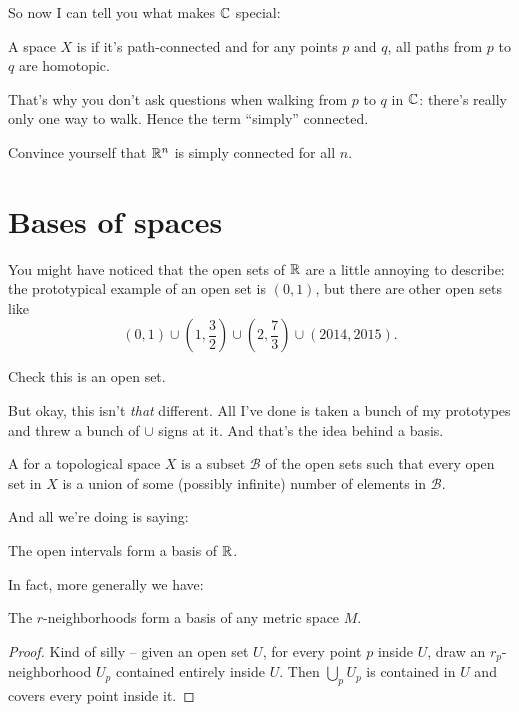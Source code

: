 So now I can tell you what makes $\mathbb C$ special:
\begin{definition}
	A space $X$ is  if it's path-connected and
	for any points $p$ and $q$, all paths from $p$ to $q$ are homotopic.
\end{definition}
That's why you don't ask questions when walking from $p$ to $q$ in $\mathbb C$:
there's really only one way to walk. Hence the term ``simply'' connected.

\begin{ques}
	Convince yourself that $\mathbb R^n$ is simply connected for all $n$.
\end{ques}

\section{Bases of spaces}

You might have noticed that the open sets of $\RR$ are a little annoying to describe:
the prototypical example of an open set is $(0,1)$,
but there are other open sets like
\[
	(0,1)
	\cup \left( 1, \frac32 \right)
	\cup \left( 2, \frac 73 \right)
	\cup (2014, 2015). \]
\begin{ques}
	Check this is an open set.
\end{ques}

But okay, this isn't \emph{that} different.
All I've done is taken a bunch of my prototypes and threw a bunch of $\cup$ signs at it.
And that's the idea behind a basis.

\begin{definition}
	A  for a topological space $X$
	is a subset $\mathcal B$ of the open sets such that every open set in $X$
	is a union of some (possibly infinite) number of elements in $\mathcal B$.
\end{definition}

And all we're doing is saying:
\begin{example}[Basis of $\RR$]
	The open intervals form a basis of $\RR$.
\end{example}
In fact, more generally we have:
\begin{theorem}
	The $r$-neighborhoods form a basis of any metric space $M$.
\end{theorem}
\begin{proof}
	Kind of silly -- given an open set $U$, for every point $p$ inside $U$,
	draw an $r_p$-neighborhood $U_p$ contained entirely inside $U$.
	Then $\bigcup_p U_p$ is contained in $U$ and covers every point inside it.
\end{proof}


